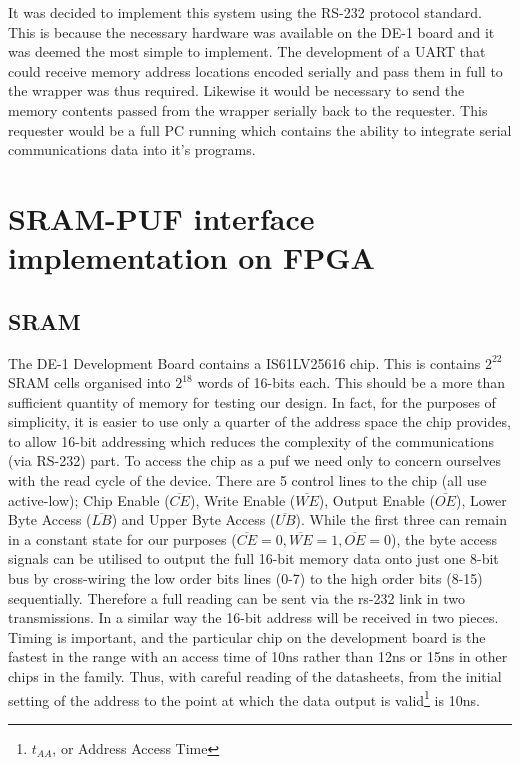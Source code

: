 It was decided to implement this system using the RS-232 protocol standard. 
This is because the necessary hardware was available on the DE-1 board and it was
deemed the most simple to implement.
The development of a UART that could receive memory address locations encoded
serially and pass them in full to the wrapper was thus required.
Likewise it would be necessary to send the memory contents passed from the 
wrapper serially back to the requester.
This requester would be a full PC running \matlab which contains
the ability to integrate serial communications data into it's programs.

\section{SRAM-PUF interface implementation on FPGA}

\subsection{SRAM}

The DE-1 Development Board contains a IS61LV25616 chip. This is contains
$2^{22}$ SRAM cells organised into $2^{18}$ words of 16-bits each. This
should be a more than sufficient quantity of memory for testing our design.
In fact, for the purposes of simplicity, it is easier to use only a quarter
of the address space the chip provides, to allow 16-bit addressing which
reduces the complexity of the communications (via RS-232) part.
To access the chip as a \gls{puf} we need only to concern ourselves with
the read cycle of the device. There are 5 control lines to the chip (all
use active-low);
Chip Enable ($\overline{CE}$),
Write Enable ($\overline{WE}$),
Output Enable ($\overline{OE}$),
Lower Byte Access ($\overline{LB}$) and
Upper Byte Access ($\overline{UB}$).
While the first three can remain in a constant state for our purposes
($\overline{CE} = 0, \overline{WE} = 1, \overline{OE} = 0$), the byte access signals
can be utilised to output the full 16-bit memory data onto just one 8-bit bus
by cross-wiring the low order bits lines (0-7) to the high order bits (8-15)
sequentially.
Therefore a full reading can be sent via the rs-232 link in two transmissions.
In a similar way the 16-bit address will be received in two pieces.
Timing is important, and the particular chip on the development board is the 
fastest in the range with an access time of 10ns rather than 12ns or 15ns in
other chips in the family.
Thus, with careful reading of the datasheets\cite{sramdatasheet}, from
the initial setting of the address to the point at which the data output is
valid\footnote{$t_{AA}$, or Address Access Time} is 10ns.


